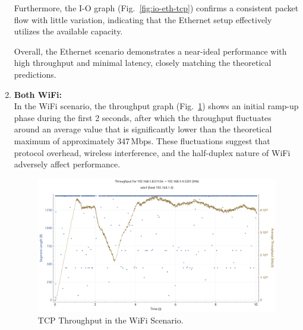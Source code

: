 \begin{enumerate}
                Furthermore, the I-O graph (Fig.~\ref{fig:io-eth-tcp}) confirms a consistent packet flow with little variation, indicating that the Ethernet setup effectively utilizes the available capacity. 
                

                Overall, the Ethernet scenario demonstrates a near-ideal performance with high throughput and minimal latency, closely matching the theoretical predictions.

            \item \textbf{Both WiFi:} \\
                In the WiFi scenario, the throughput graph (Fig.~\ref{fig:throughput-wifi-tcp}) shows an initial ramp-up phase during the first 2 seconds, after which the throughput fluctuates around an average value that is significantly lower than the theoretical maximum of approximately 347\,Mbps. 
                These fluctuations suggest that protocol overhead, wireless interference, and the half-duplex nature of WiFi adversely affect performance. \\
                
                \begin{figure}[ht]
                    \centering
                    \includegraphics[width=0.9\columnwidth]{images/graphs/Throughput/Throughput_WiFi_TCP.pdf}
                    \caption{TCP Throughput in the WiFi Scenario.}
                    \label{fig:throughput-wifi-tcp}
                \end{figure}


\end{enumerate}
